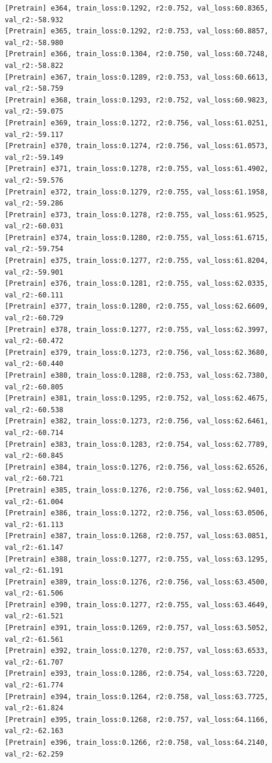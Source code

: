 \documentclass[a4paper, 12pt]{article}
\begin{document}
\begin{lstlisting}
[Pretrain] e364, train_loss:0.1292, r2:0.752, val_loss:60.8365, val_r2:-58.932
[Pretrain] e365, train_loss:0.1292, r2:0.753, val_loss:60.8857, val_r2:-58.980
[Pretrain] e366, train_loss:0.1304, r2:0.750, val_loss:60.7248, val_r2:-58.822
[Pretrain] e367, train_loss:0.1289, r2:0.753, val_loss:60.6613, val_r2:-58.759
[Pretrain] e368, train_loss:0.1293, r2:0.752, val_loss:60.9823, val_r2:-59.075
[Pretrain] e369, train_loss:0.1272, r2:0.756, val_loss:61.0251, val_r2:-59.117
[Pretrain] e370, train_loss:0.1274, r2:0.756, val_loss:61.0573, val_r2:-59.149
[Pretrain] e371, train_loss:0.1278, r2:0.755, val_loss:61.4902, val_r2:-59.576
[Pretrain] e372, train_loss:0.1279, r2:0.755, val_loss:61.1958, val_r2:-59.286
[Pretrain] e373, train_loss:0.1278, r2:0.755, val_loss:61.9525, val_r2:-60.031
[Pretrain] e374, train_loss:0.1280, r2:0.755, val_loss:61.6715, val_r2:-59.754
[Pretrain] e375, train_loss:0.1277, r2:0.755, val_loss:61.8204, val_r2:-59.901
[Pretrain] e376, train_loss:0.1281, r2:0.755, val_loss:62.0335, val_r2:-60.111
[Pretrain] e377, train_loss:0.1280, r2:0.755, val_loss:62.6609, val_r2:-60.729
[Pretrain] e378, train_loss:0.1277, r2:0.755, val_loss:62.3997, val_r2:-60.472
[Pretrain] e379, train_loss:0.1273, r2:0.756, val_loss:62.3680, val_r2:-60.440
[Pretrain] e380, train_loss:0.1288, r2:0.753, val_loss:62.7380, val_r2:-60.805
[Pretrain] e381, train_loss:0.1295, r2:0.752, val_loss:62.4675, val_r2:-60.538
[Pretrain] e382, train_loss:0.1273, r2:0.756, val_loss:62.6461, val_r2:-60.714
[Pretrain] e383, train_loss:0.1283, r2:0.754, val_loss:62.7789, val_r2:-60.845
[Pretrain] e384, train_loss:0.1276, r2:0.756, val_loss:62.6526, val_r2:-60.721
[Pretrain] e385, train_loss:0.1276, r2:0.756, val_loss:62.9401, val_r2:-61.004
[Pretrain] e386, train_loss:0.1272, r2:0.756, val_loss:63.0506, val_r2:-61.113
[Pretrain] e387, train_loss:0.1268, r2:0.757, val_loss:63.0851, val_r2:-61.147
[Pretrain] e388, train_loss:0.1277, r2:0.755, val_loss:63.1295, val_r2:-61.191
[Pretrain] e389, train_loss:0.1276, r2:0.756, val_loss:63.4500, val_r2:-61.506
[Pretrain] e390, train_loss:0.1277, r2:0.755, val_loss:63.4649, val_r2:-61.521
[Pretrain] e391, train_loss:0.1269, r2:0.757, val_loss:63.5052, val_r2:-61.561
[Pretrain] e392, train_loss:0.1270, r2:0.757, val_loss:63.6533, val_r2:-61.707
[Pretrain] e393, train_loss:0.1286, r2:0.754, val_loss:63.7220, val_r2:-61.774
[Pretrain] e394, train_loss:0.1264, r2:0.758, val_loss:63.7725, val_r2:-61.824
[Pretrain] e395, train_loss:0.1268, r2:0.757, val_loss:64.1166, val_r2:-62.163
[Pretrain] e396, train_loss:0.1266, r2:0.758, val_loss:64.2140, val_r2:-62.259

\end{lstlisting}
\end{document}
